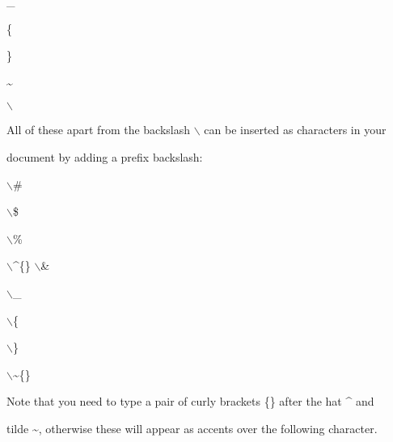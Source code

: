 \documentclass[a4paper,portrait,12pt]{article}
\begin{document}
\_





\{





\}





\~{}





\ensuremath{\backslash}





\begin{flushleft}
All of these apart from the backslash \ensuremath{\backslash} can be inserted as characters in your
\end{flushleft}


\begin{flushleft}
document by adding a prefix backslash:
\end{flushleft}


\ensuremath{\backslash}\#





\ensuremath{\backslash}\$





\ensuremath{\backslash}\%





\ensuremath{\backslash}\^{}\{\} \ensuremath{\backslash}\&





\ensuremath{\backslash}\_





\ensuremath{\backslash}\{





\ensuremath{\backslash}\}





\ensuremath{\backslash}\~{}\{\}





\begin{flushleft}
Note that you need to type a pair of curly brackets \{\} after the hat \^{} and
\end{flushleft}


\begin{flushleft}
tilde \~{}, otherwise these will appear as accents over the following character.
\end{flushleft}
\end{document}
